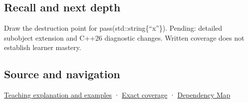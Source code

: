 \subsection{Recall and next depth}\label{appendix-a978b29bbbb0-recall-and-next-depth}

Draw the destruction point for pass(std::string\{``x''\}). Pending: detailed subobject extension and C++26 diagnostic changes. Written coverage does not establish learner mastery.

\subsection{Source and navigation}\label{appendix-a978b29bbbb0-source-and-navigation}

\hyperref[01-foundations-i-ch003-a-temporary-needs-an-explicit-lifetime-story]{Teaching explanation and examples} · \hyperref[appendix-fd090d982a15-m008---parts-113-126]{Exact coverage} · \hyperref[appendix-4ad47bdd269a]{Dependency Map}
